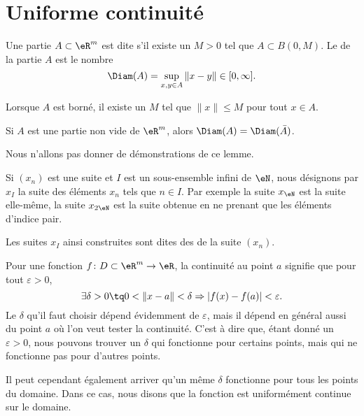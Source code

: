 \section{Uniforme continuité}		\label{SecUnifContinue}

\begin{definition}
	Une partie $A\subset\eR^m$ est dite  s'il existe un $M>0$ tel que $A\subset B(0,M)$. Le  de la partie $A$ est le nombre
	\begin{equation}
		\Diam(A)=\sup_{x,y\in A}\| x-y \|\in\mathopen[ 0 , \infty \mathclose].
	\end{equation}
\end{definition}
Lorsque $A$ est borné, il existe un $M$ tel que $\| x \|\leq M$ pour tout $x\in A$.

\begin{lemma}
	Si $A$ est une partie non vide de $\eR^m$, alors $\Diam(A)=\Diam(\bar A)$.
\end{lemma}
Nous n'allons pas donner de démonstrations de ce lemme.


Si $(x_n)$ est une suite et $I$ est un sous-ensemble infini de $\eN$, nous désignons par $x_I$ la suite des éléments $x_n$ tels que $n\in I$. Par exemple la suite $x_{\eN}$ est la suite elle-même, la suite $x_{2\eN}$ est la suite obtenue en ne prenant que les éléments d'indice pair.

Les suites $x_I$ ainsi construites sont dites des  de la suite $(x_n)$.


Pour une fonction $f\colon D\subset\eR^m\to \eR$, la continuité au point $a$ signifie que pour tout $\varepsilon>0$,
\begin{equation}
	\exists\delta>0\tq 0<\| x-a \|<\delta\Rightarrow | f(x)-f(a) |<\varepsilon.
\end{equation}
Le $\delta$ qu'il faut choisir dépend évidemment de $\varepsilon$, mais il dépend en général aussi du point $a$ où l'on veut tester la continuité. C'est à dire que, étant donné un $\varepsilon>0$, nous pouvons trouver un $\delta$ qui fonctionne pour certains points, mais qui ne fonctionne pas pour d'autres points.

Il peut cependant également arriver qu'un même $\delta$ fonctionne pour tous les points du domaine. Dans ce cas, nous disons que la fonction est uniformément continue sur le domaine.

